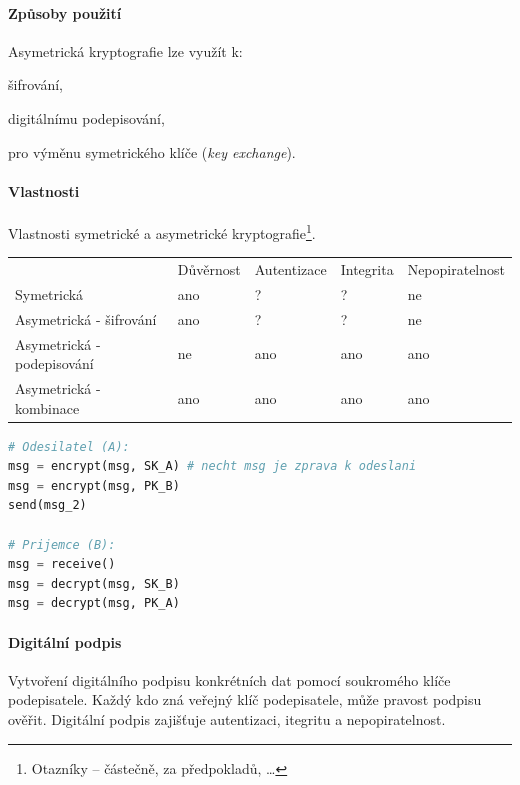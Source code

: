 \paragraph*{Způsoby použití} Asymetrická kryptografie lze využít k: \begin{compactitem}
    \item šifrování,
    \item digitálnímu podepisování,
    \item pro výměnu symetrického klíče (\textit{key exchange}).
\end{compactitem}

\paragraph*{Vlastnosti} Vlastnosti symetrické a asymetrické kryptografie\footnote{Otazníky -- částečně, za předpokladů, \dots}.
\begin{table}[H]
\begin{tabular}{lllll}
& Důvěrnost & Autentizace & Integrita & Nepopiratelnost \\
Symetrická & ano & ? & ? & ne \\
Asymetrická - šifrování & ano & ? & ? & ne \\
Asymetrická - podepisování & ne & ano & ano & ano \\
Asymetrická - kombinace & ano & ano & ano & ano
\end{tabular}
\end{table}

\bigskip\noindent\begin{minipage}{\linewidth}
\begin{lstlisting}[language=Python, caption={Kombinace klíčů obou stran u~asymetrický kryptografie. Pořadí operací může být i opačné.}]
# Odesilatel (A):
msg = encrypt(msg, SK_A) # necht msg je zprava k odeslani
msg = encrypt(msg, PK_B)
send(msg_2)

# Prijemce (B):
msg = receive()
msg = decrypt(msg, SK_B)
msg = decrypt(msg, PK_A)
\end{lstlisting}
\end{minipage}

\paragraph*{Digitální podpis} Vytvoření digitálního podpisu konkrétních dat pomocí soukromého klíče podepisatele. Každý kdo zná veřejný klíč podepisatele, může pravost podpisu ověřit. Digitální podpis zajišťuje autentizaci, itegritu a nepopiratelnost.

